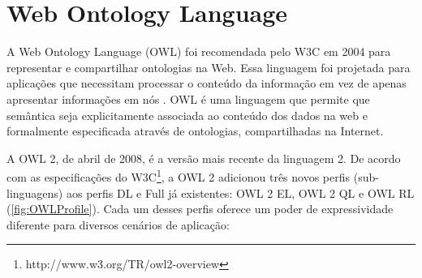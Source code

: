 \section{Web Ontology Language}

A Web Ontology Language (OWL) foi recomendada pelo W3C em 2004 para representar e compartilhar ontologias na Web. Essa linguagem foi projetada para aplicações que necessitam processar o conteúdo da informação em vez de apenas apresentar informações em nós \cite{McGuinness2004}. OWL é uma linguagem que permite que semântica seja explicitamente associada ao conteúdo dos dados na web e formalmente especificada através de ontologias, compartilhadas na Internet.

A OWL 2, de abril de 2008, é a versão mais recente da linguagem 2. De acordo com as especificações do W3C\footnote{http://www.w3.org/TR/owl2-overview}, a OWL 2 adicionou três novos perfis (sub-linguagens) aos perfis DL e Full já existentes: OWL 2 EL, OWL 2 QL e OWL RL (\autoref{fig:OWLProfile}). Cada um desses perfis oferece um poder de expressividade diferente para diversos cenários de aplicação:

